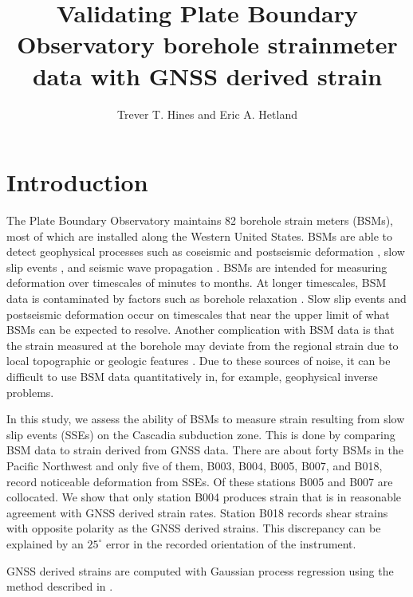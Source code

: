\documentclass[10pt,a4paper]{article}
\title{Validating Plate Boundary Observatory borehole strainmeter data with GNSS derived strain}
\author{Trever T. Hines and Eric A. Hetland}
\begin{document}
\maketitle


\section{Introduction}\label{sec:Introduction}
The Plate Boundary Observatory maintains 82 borehole strain meters (BSMs), most of which are installed along the Western United States. BSMs are able to detect geophysical processes such as coseismic and postseismic deformation \citep[e.g.,][]{Langbein2006,Langbein2015}, slow slip events \citep[e.g.,][]{Dragert2011}, and seismic wave propagation \citep{Barbour2017}. BSMs are intended for measuring deformation over timescales of minutes to months. At longer timescales, BSM data is contaminated by factors such as borehole relaxation \citep{Gladwin1987}. Slow slip events and postseismic deformation occur on timescales that near the upper limit of what BSMs can be expected to resolve. Another complication with BSM data is that the strain measured at the borehole may deviate from the regional strain due to local topographic or geologic features \citep{Berger1976}. Due to these sources of noise, it can be difficult to use BSM data quantitatively in, for example,  geophysical inverse problems.

In this study, we assess the ability of BSMs to measure strain resulting from slow slip events (SSEs) on the Cascadia subduction zone. This is done by comparing BSM data to strain derived from GNSS data. There are about forty BSMs in the Pacific Northwest and only five of them, B003, B004, B005, B007, and B018, record noticeable deformation from SSEs. Of these stations B005 and B007 are collocated. We show that only station B004 produces strain that is in reasonable agreement with GNSS derived strain rates.  Station B018 records shear strains with opposite polarity as the GNSS derived strains. This discrepancy can be explained by an $25^\circ$ error in the recorded orientation of the instrument. 

GNSS derived strains are computed with Gaussian process regression using the method described in \citep{Hines2017}.   
\end{document}
